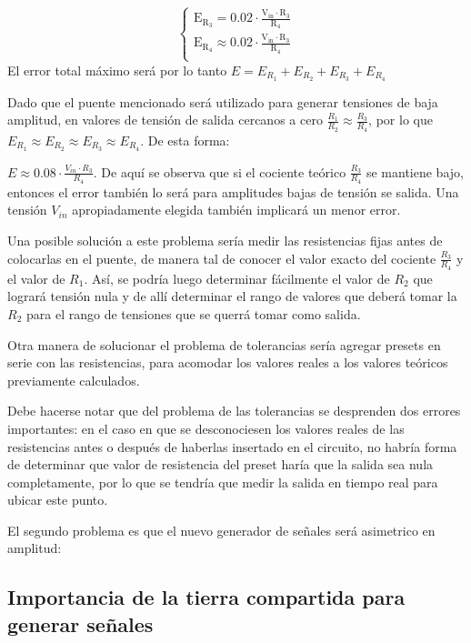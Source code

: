 \documentclass[../../tc_tp3_main.tex]{subfiles}
\begin{document}
 	 	 	\begin{equation}
  	   \left\{
	  	    \begin{array}{ll}
		 					\mathrm{E_{R_3} = 0.02 \cdot \frac{V_{in}\cdot R_3}{R_4}}\\
			 				\mathrm{E_{R_4}  \approx 0.02 \cdot \frac{V_{in} \cdot R_3}{R_4}}  \\
	     	 \end{array}
	     	\right.
 	\end{equation}
 	El error total máximo será por lo tanto $E = E_{R_1} + E_{R_2} + E_{R_3} + E_{R_4}$\par
 	Dado que el puente mencionado será utilizado para generar tensiones de baja amplitud, en valores de tensión de salida cercanos a cero $\frac{R_1}{R_2}\approx\frac{R_3}{R_4}$, por lo que $E_{R_1} \approx E_{R_2} \approx E_{R_3} \approx E_{R_4}$. De esta forma: \par
 	$E \approx 0.08 \cdot \frac{V_{in}\cdot R_3}{R_4}$. De aquí se observa que si el cociente teórico $\frac{R_3}{R_4}$ se mantiene bajo, entonces el error también lo será para amplitudes bajas de tensión se salida. Una tensión $V_{in}$ apropiadamente elegida también implicará un menor error.\par
 	Una posible solución a este problema sería medir las resistencias fijas antes de colocarlas en el puente, de manera tal de conocer el valor exacto del cociente $\frac{R_3}{R_4}$ y el valor de $R_1$. Así, se podría luego determinar fácilmente el valor de $R_2$ que logrará tensión nula y de allí determinar el rango de valores que deberá tomar la $R_2$ para el rango de tensiones que se querrá tomar como salida. \par
 	Otra manera de solucionar el problema de tolerancias sería agregar presets en serie con las resistencias, para acomodar los valores reales a los valores teóricos previamente calculados.\par
 	Debe hacerse notar que del problema de las tolerancias se desprenden dos errores importantes: en el caso en que se desconociesen los valores reales de las resistencias antes o después de haberlas insertado en el circuito, no habría forma de determinar que valor de resistencia del preset haría que la salida sea nula completamente, por lo que se tendría que medir la salida en tiempo real para ubicar este punto. \par
 	El segundo problema es que el nuevo generador de señales será asimetrico en amplitud:
 	
\subsection{Importancia de la tierra compartida para generar señales}
\end{document}
